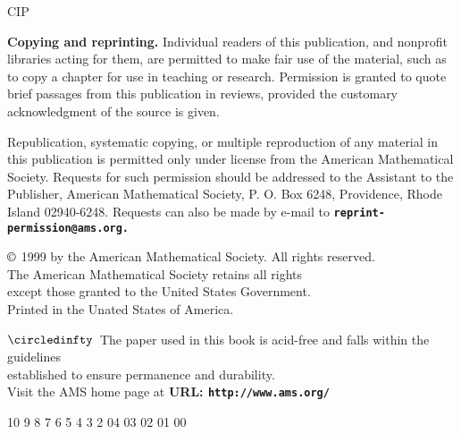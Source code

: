 \begin{copyrightpage}
\hfill CIP

\hrulefill

\textbf{Copying and reprinting.} Individual readers of this
publication, and nonprofit libraries acting for them, are permitted
to make fair use of the material, such as to copy a chapter for use
in teaching or research. Permission is granted to quote brief
passages from this publication in reviews, provided the customary
acknowledgment of the source is given.

Republication, systematic copying, or multiple reproduction of any
material in this publication is permitted only under license from
the American Mathematical Society. Requests for such permission
should be addressed to the Assistant to the Publisher, American
Mathematical Society, P. O. Box 6248, Providence, Rhode Island
02940-6248. Requests can also be made by e-mail to
\textbf{\texttt{reprint-permission@ams.org.}}

\begin{center}
$\copyright$ 1999 by the American Mathematical Society. All rights reserved.\\
The American Mathematical Society retains all rights\\
except those granted to the United States Government.\\
Printed in the Unated States of America.
\end{center}

\begin{center}
$\circledinfty$\ The paper used in this book is acid-free and falls within the guidelines\\
established to ensure permanence and durability.\\
Visit the AMS home page at \textbf{URL:
\texttt{http://www.ams.org/}}
\end{center}

\begin{center}
10 9 8 7 6 5 4 3 2  04 03 02 01 00
\end{center}
\end{copyrightpage}
